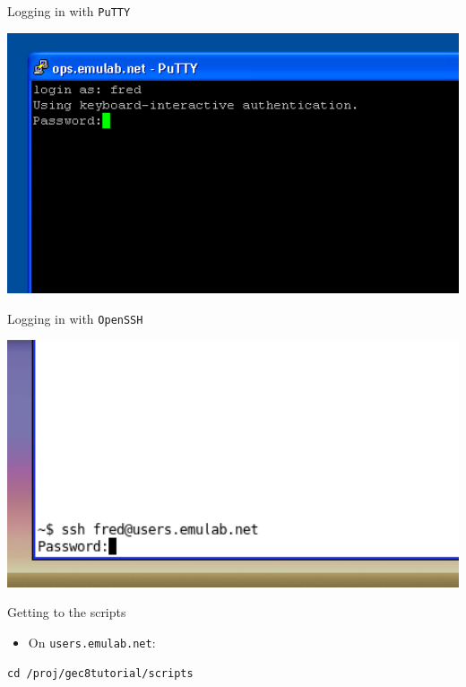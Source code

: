 \documentclass[landscape]{slides}
\newcommand{\heading}[1]{{\fontseries{b}\selectfont\begin{center}{\LARGE\color{red} #1}\end{center}}}
\newcommand{\code}[1]{\begin{center}{\tt #1}\end{center}}
\begin{document}
\begin{slide}
\heading{Logging in with {\tt PuTTY}}
\begin{center}
\includegraphics[width=17cm]{putty-2}
\end{center}
\end{slide}

\begin{slide}
\heading{Logging in with {\tt OpenSSH}}
\begin{center}
\includegraphics[width=17cm]{openssh}
\end{center}
\end{slide}

\begin{slide}
\heading{Getting to the scripts}
\begin{itemize}
\item On {\tt users.emulab.net}:
\end{itemize}
\begin{Large}\code{cd /proj/gec8tutorial/scripts}\end{Large}
\end{slide}
\end{document}

